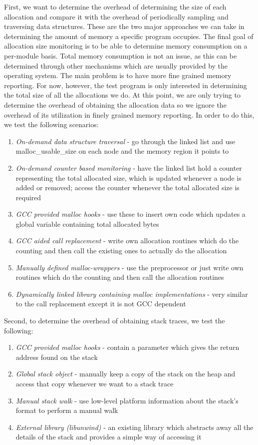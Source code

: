 First, we want to determine the overhead of determining the size of each allocation and compare it with the overhead of periodically sampling and traversing data structures. These are the two major approaches we can take in determining the amount of memory a specific program occupies. The final goal of allocation size monitoring is to be able to determine memory consumption on a per-module basis. Total memory consumption is not an issue, as this can be determined through other mechanisms which are usually provided by the operating system. The main problem is to have more fine grained memory reporting. For now, however, the test program is only interested in determining the total size of all the allocations we do. At this point, we are only trying to determine the overhead of obtaining the allocation data so we ignore the overhead of its utilization in finely grained memory reporting. In order to do this, we test the following scenarios:
\begin{enumerate}
\item \textit{On-demand data structure traversal} - go through the linked list and use malloc\_usable\_size on each node and the memory region it points to
\item \textit{On-demand counter based monitoring} - have the linked list hold a counter representing the total allocated size, which is updated whenever a node is added or removed; access the counter whenever the total allocated size is required
\item \textit{GCC provided malloc hooks} - use these to insert own code which updates a global variable containing total allocated bytes
\item \textit{GCC aided call replacement} - write own allocation routines which do the counting and then call the existing ones to actually do the allocation
\item \textit{Manually defined malloc-wrappers} - use the preprocessor or just write own routines which do the counting and then call the allocation routines
\item \textit{Dynamically linked library containing malloc implementations} - very similar to the call replacement except it is not GCC dependent
\end{enumerate}

Second, to determine the overhead of obtaining stack traces, we test the following:
\begin{enumerate}
\item \textit{GCC provided malloc hooks} - contain a parameter which gives the return address found on the stack
\item \textit{Global stack object} - manually keep a copy of the stack on the heap and access that copy whenever we want to a stack trace
\item \textit{Manual stack walk} - use low-level platform information about the stack's format to perform a manual walk
\item \textit{External library (libunwind)} - an existing library which abstracts away all the details of the stack and provides a simple way of accessing it
\end{enumerate}

